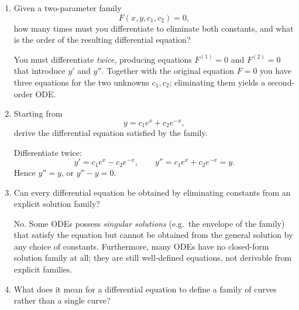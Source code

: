\documentclass{essay}
\begin{document}
\begin{enumerate}[leftmargin=*, itemsep=8pt]
    \begin{answer} The IFT hypothesis fails; we can no longer
      guarantee a local smooth branch $y=f(x)$ near such a point.
      Geometrically, these are \emph{singular points}: the tangent line
      may be vertical (if $F_x\neq 0$), or the curve may cross itself,
      develop a cusp, or be isolated.  The implicit-derivative formula
      $-F_x/F_y$ is undefined there.
    \end{answer}

  \item Given a two-parameter family \[ F(x,y,c_1,c_2)=0, \] how many
    times must you differentiate to eliminate both constants, and
    what is the order of the resulting differential equation?

    \begin{answer} You must differentiate \emph{twice}, producing
      equations $F^{(1)}=0$ and $F^{(2)}=0$ that introduce $y'$ and
      $y''$.  Together with the original equation $F=0$ you have three
      equations for the two unknowns $c_1,c_2$; eliminating them yields
      a second-order ODE.
    \end{answer}

  \item Starting from \[ y=c_1e^x+c_2e^{-x}, \] derive the
    differential equation satisfied by the family.

    \begin{answer} Differentiate twice:
      \[
        y'  = c_1 e^x - c_2 e^{-x}, \qquad
        y'' = c_1 e^x + c_2 e^{-x} = y.
      \]
      Hence $y'' = y$, or $y''-y=0$.
    \end{answer}

  \item Can every differential equation be obtained by eliminating
    constants from an explicit solution family?

    \begin{answer} No.  Some ODEs possess \emph{singular solutions}
      (e.g.\ the envelope of the family) that satisfy the equation but
      cannot be obtained from the general solution by any choice of
      constants.  Furthermore, many ODEs have no closed-form solution
      family at all; they are still well-defined equations, not
      derivable from explicit families.
    \end{answer}

  \item What does it mean for a differential equation to define a
    family of curves rather than a single curve?


\end{enumerate}
\end{document}
